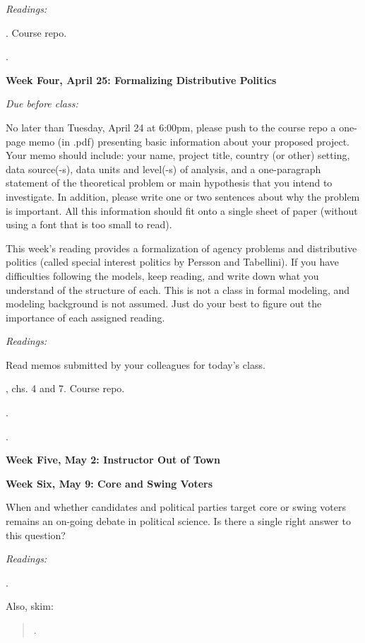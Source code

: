\documentclass[11pt]{article}
\begin{document}
\textit{Readings:}

. Course repo. 

\href{DOI: 10.1146/annurev-polisci-052209-121553}{}.

\textbf{Week Four, April 25: Formalizing Distributive Politics}

\textit{Due before class:}

No later than Tuesday, April 24 at 6:00pm, please push to the course repo
a one-page memo (in .pdf) presenting basic information about your proposed project. Your memo should include: 
your name, project title, country (or other) setting, data source(-s), data units and level(-s) of analysis,
and a one-paragraph statement of the theoretical problem or main
hypothesis that you intend
to investigate. In addition, please write one or two sentences about why the problem is important. 
All this information should fit onto a single sheet of paper
(without using a font that is too small to read). 

This week's reading provides a formalization of agency problems and distributive politics (called special interest
politics by Persson and Tabellini). If you have difficulties following the models, keep reading, and write down what
you understand of the structure of each. This is not a class in formal modeling, and modeling background is not assumed. Just do your best to figure out the importance of each assigned reading.

\textit{Readings:}

Read memos submitted by your colleagues for today's class. 

, chs. 4 and 7. Course repo.

\href{http://link.springer.com/article/10.1007\%2FBF00124924?LI=true}{}. 

\href{http://dx.doi.org/10.2307/2960152}{}. 

\textbf{Week Five, May 2: Instructor Out of Town}

\textbf{Week Six, May 9: Core and Swing Voters}

When and whether candidates and political parties target core or swing voters remains an on-going debate in political science. 
Is there a single right answer to this question?

\textit{Readings:}

\href{http://dx.doi.org/10.1017/S0003055405051683}{}.

Also, skim:
\begin{quote}
\href{http://dx.doi.org/10.1017/S0003055408080106}{}. 
\end{quote}
\end{document}
